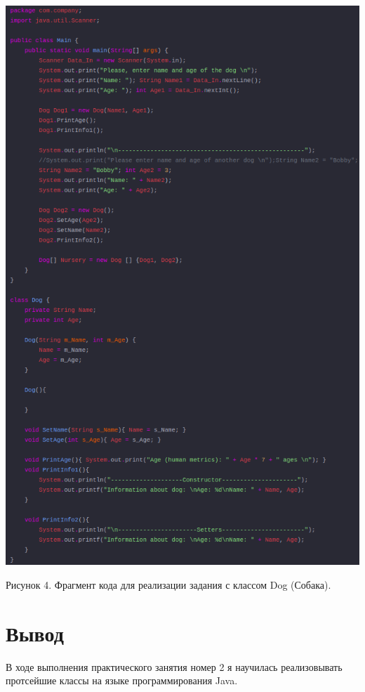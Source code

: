 \documentclass{article}
\begin{document}
\includegraphics[width=0.94\linewidth]{view4.png}

\caption{Рисунок 4. Фрагмент кода для реализации задания с классом Dog (Собака).}

\section{Вывод}
В ходе выполнения практического занятия номер 2 я научилась реализовывать протсейшие классы на языке программирования Java.
\end{document}
